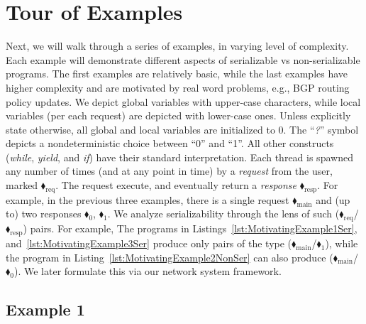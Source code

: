 

\section{Tour of Examples}
\label{sec:tour}

Next, we will walk through a series of examples, in varying level of complexity. Each example will demonstrate different aspects of serializable vs non-serializable programs.
%
The first examples are relatively basic, while the last examples have higher complexity and are motivated by real word problems, e.g., BGP routing policy updates.
%
We depict global variables with upper-case characters, while local variables (per each request) are depicted with lower-case ones.
%
Unless explicitly state otherwise, all global and local variables are initialized to 0.
%
The ``\textit{?}'' symbol depicts a nondeterministic choice between ``0'' and ``1''. All other constructs (\textit{while}, \textit{yield}, and \textit{if}) have their standard interpretation.
%
Each thread is spawned any number of times (and at any point in time) by a \textit{request} from the user, marked {\color{ForestGreen}$\blacklozenge_\text{req}$}. The request execute, and eventually return a \textit{response}  {\color{red}$\blacklozenge_\text{resp}$}.
%
For example, in the previous three examples, there is a single request {\color{ForestGreen}$\blacklozenge_\text{main}$} and (up to) two responses {\color{red}$\blacklozenge_0$}, {\color{red}$\blacklozenge_1$}.
% 
We analyze serializability through the lens of such ({\color{ForestGreen}$\blacklozenge_\text{req}$}/{\color{red}$\blacklozenge_\text{resp}$}) pairs. For example, The programs in Listings~\ref{lst:MotivatingExample1Ser}, and~\ref{lst:MotivatingExample3Ser} produce only pairs of the type ({\color{ForestGreen}$\blacklozenge_\text{main}$}/{\color{red}$\blacklozenge_1$}), while the program in Listing~\ref{lst:MotivatingExample2NonSer} can also produce ({\color{ForestGreen}$\blacklozenge_\text{main}$}/{\color{red}$\blacklozenge_0$}). We later formulate this via our network system framework. 

\subsection{Example 1}


